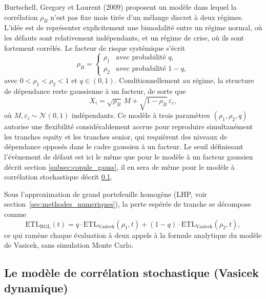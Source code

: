 Burtschell, Gregory et Laurent (2009) proposent un modèle dans lequel la corrélation
$\rho_B$ n'est pas fixe mais tirée d'un mélange discret à deux régimes. L'idée est de représenter
explicitement une bimodalité entre un régime normal, où les défauts sont relativement indépendants,
et un régime de crise, où ils sont fortement corrélés. Le facteur de risque systémique s'écrit
\begin{equation}
    \rho_B = \begin{cases} \rho_1 & \text{avec probabilité } q, \\ \rho_2 & \text{avec probabilité } 1-q, \end{cases}
\end{equation}
avec $0 < \rho_1 < \rho_2 < 1$ et $q \in (0,1)$. Conditionnellement au régime, la structure
de dépendance reste gaussienne à un facteur, de sorte que
\begin{equation}
    X_i = \sqrt{\rho_B}\, M + \sqrt{1-\rho_B}\, \varepsilon_i,
\end{equation}
où $M, \varepsilon_i \sim \mathcal{N}(0,1)$ indépendants. Ce modèle à trois paramètres $(\rho_1, \rho_2, q)$
autorise une flexibilité considérablement accrue pour reproduire simultanément les tranches
equity et les tranches senior, qui requièrent des niveaux de dépendance opposés dans le cadre
gaussien à un facteur. Le seuil définissant l'évènement de défaut est ici le même que pour le
modèle à un facteur gaussien décrit section \ref{subsec:copule_gauss}, il en sera de même pour le
modèle à corrélation stochastique décrit \ref{subsec:copule_cor_sto}.

Sous l'approximation de grand portefeuille homogène (LHP, voir
section~\ref{sec:methodes_numeriques}), la perte espérée de tranche se décompose comme
\begin{equation}
    \mathrm{ETL}_\text{BGL}(t) = q \cdot \mathrm{ETL}_\text{Vasicek}(\rho_1, t)
    + (1-q) \cdot \mathrm{ETL}_\text{Vasicek}(\rho_2, t),
\end{equation}
ce qui ramène chaque évaluation à deux appels à la formule analytique du modèle de Vasicek,
sans simulation Monte Carlo.

\subsection{Le modèle de corrélation stochastique (Vasicek dynamique)}\label{subsec:copule_cor_sto}

